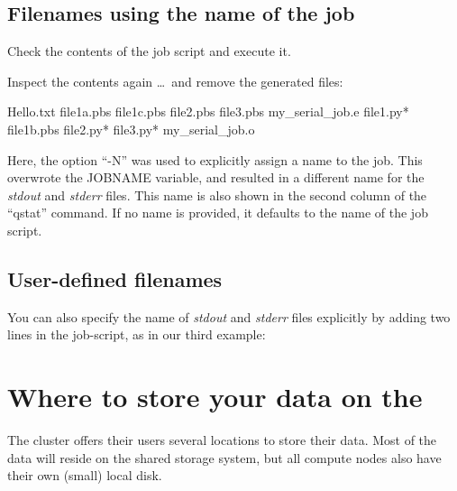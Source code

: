 \subsection{Filenames using the name of the job}

Check the contents of the job script and execute it.


\begin{prompt}
\end{prompt}

Inspect the contents again \dots\ and remove the generated files:

\begin{prompt}
Hello.txt  file1a.pbs  file1c.pbs  file2.pbs  file3.pbs  my_serial_job.e%
file1.py*  file1b.pbs  file2.py*   file3.py*  my_serial_job.o%
\end{prompt}

Here, the option ``-N'' was used to explicitly assign a name to the job.  This
overwrote the JOBNAME variable, and resulted in a different name for the
\emph{stdout} and \emph{stderr} files. This name is also shown in the
second column of the ``qstat'' command. If no name is provided, it defaults to
the name of the job script.

\subsection{User-defined filenames}

You can also specify the name of \emph{stdout} and \emph{stderr} files
explicitly by adding two lines in the job-script, as in our third example:


\begin{prompt}
\end{prompt}

\section{Where to store your data on the \hpc}

The \hpc cluster offers their users several locations to store their data. Most
of the data will reside on the shared storage system, but all compute nodes
also have their own (small) local disk.

